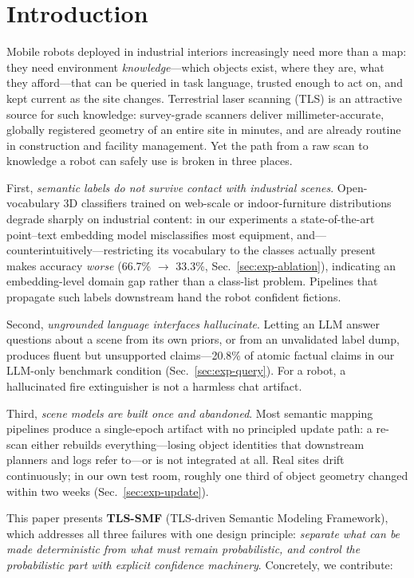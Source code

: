 \section{Introduction}
\label{sec:introduction}

Mobile robots deployed in industrial interiors increasingly need more than a
map: they need environment \emph{knowledge}---which objects exist, where they
are, what they afford---that can be queried in task language, trusted enough
to act on, and kept current as the site changes. Terrestrial laser scanning
(TLS) is an attractive source for such knowledge: survey-grade scanners
deliver millimeter-accurate, globally registered geometry of an entire site
in minutes, and are already routine in construction and facility management.
Yet the path from a raw scan to knowledge a robot can safely use is broken in
three places.

First, \emph{semantic labels do not survive contact with industrial scenes}.
Open-vocabulary 3D classifiers trained on web-scale or indoor-furniture
distributions degrade sharply on industrial content: in our experiments a
state-of-the-art point--text embedding model misclassifies most equipment,
and---counterintuitively---restricting its vocabulary to the classes actually
present makes accuracy \emph{worse} (66.7\% $\rightarrow$ 33.3\%,
Sec.~\ref{sec:exp-ablation}), indicating an embedding-level domain gap rather than a class-list
problem. Pipelines that propagate such labels downstream hand the robot
confident fictions.

Second, \emph{ungrounded language interfaces hallucinate}. Letting an LLM
answer questions about a scene from its own priors, or from an unvalidated
label dump, produces fluent but unsupported claims---20.8\% of atomic factual
claims in our LLM-only benchmark condition (Sec.~\ref{sec:exp-query}). For a robot, a
hallucinated fire extinguisher is not a harmless chat artifact.

Third, \emph{scene models are built once and abandoned}. Most semantic
mapping pipelines produce a single-epoch artifact with no principled update
path: a re-scan either rebuilds everything---losing object identities that
downstream planners and logs refer to---or is not integrated at all. Real
sites drift continuously; in our own test room, roughly one third of object
geometry changed within two weeks (Sec.~\ref{sec:exp-update}).

This paper presents \textbf{TLS-SMF} (TLS-driven Semantic Modeling
Framework), which addresses all three failures with one design principle: \emph{separate what can be made deterministic from what
must remain probabilistic, and control the probabilistic part with explicit
confidence machinery}. Concretely, we contribute:

